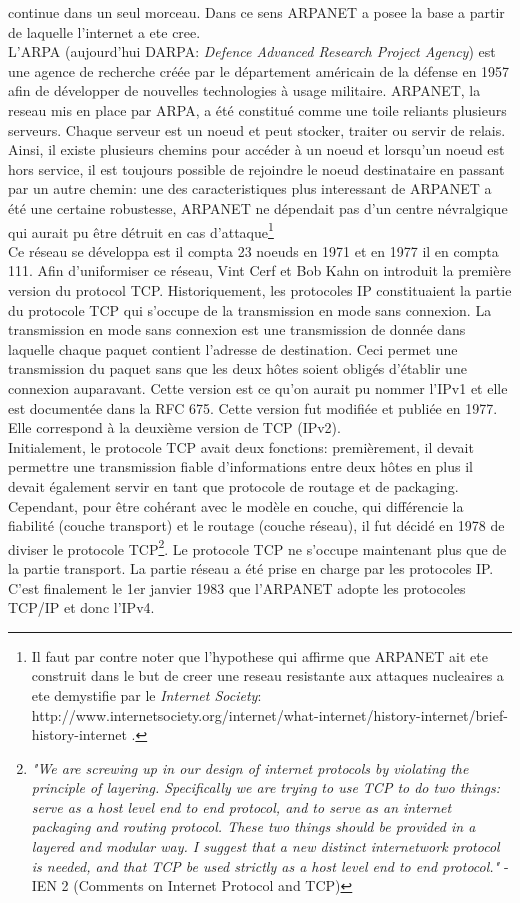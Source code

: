 continue dans un seul morceau. Dans ce sens ARPANET a posee la base a partir de 
laquelle l'internet a ete cree. 
\\
L'ARPA (aujourd'hui DARPA: {\it Defence Advanced Research Project Agency}) est
une agence de recherche créée par le département américain de la défense en
1957 afin de développer de nouvelles technologies à usage militaire.  ARPANET,
la reseau mis en place par ARPA, a été constitué comme une toile reliants
plusieurs serveurs. Chaque serveur est un noeud et peut stocker, traiter ou
servir de relais. Ainsi, il existe plusieurs chemins pour accéder à un noeud et
lorsqu'un noeud est hors service, il est toujours possible de rejoindre le
noeud destinataire en passant par un autre chemin: une des caracteristiques
plus interessant de ARPANET a été une certaine robustesse, ARPANET ne dépendait
pas d'un centre névralgique qui aurait pu être détruit en cas
d'attaque\footnote { Il faut par contre noter que l'hypothese qui affirme que
ARPANET ait ete construit dans le but de creer une reseau resistante aux
attaques nucleaires a ete demystifie par le {\it Internet Society}: 
http://www.internetsociety.org/internet/what-internet/history-internet/brief-history-internet
.}
\\
Ce réseau se développa est il compta 23 noeuds en 1971 et en 1977
il en compta 111. Afin d'uniformiser ce réseau, Vint Cerf et Bob Kahn on
introduit la première version du protocol TCP.  Historiquement, les protocoles
IP constituaient la partie du protocole TCP qui s'occupe de la transmission en
mode sans connexion. La transmission en mode sans connexion est une
transmission de donnée dans laquelle chaque paquet contient l'adresse de
destination. Ceci permet une transmission  du paquet sans que les deux hôtes
soient obligés d'établir une connexion auparavant. Cette version est ce qu'on
aurait pu nommer l'IPv1 et elle est documentée dans la RFC 675. Cette version
fut modifiée et publiée en 1977. Elle correspond à la deuxième version de TCP
(IPv2). 
\\
Initialement, le protocole TCP avait deux fonctions: premièrement, il devait
permettre une transmission fiable d'informations entre deux hôtes en plus
il devait
également servir en tant que protocole de routage et de packaging. 
Cependant,
pour être cohérant avec le modèle en couche, qui différencie la fiabilité
(couche transport) et le routage (couche réseau), il fut décidé en 1978 de
diviser le protocole TCP\footnote {
{\it "We are screwing up in our design of internet protocols by violating the
principle of layering. Specifically we are trying to use TCP to do two
things: serve as a host level end to end protocol, and to serve as an
internet packaging and routing protocol. These two things should be
provided in a layered and modular way. I suggest that a new distinct
internetwork protocol is needed, and that TCP be used strictly as a host
level end to end protocol." } - IEN 2 (Comments on Internet Protocol and TCP)
}.
Le protocole TCP ne s'occupe maintenant plus que de la partie transport. La
partie réseau a été prise en charge par les protocoles IP.  C'est finalement le
1er janvier 1983 que l'ARPANET adopte les protocoles TCP/IP et donc l'IPv4. 
